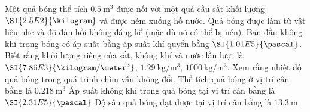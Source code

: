 \begin{ex}
	Một quả bóng thể tích $\SI{0.5}{\meter^3}$ được nối với một quả cầu sắt khối lượng $\SI{2.5E2}{\kilogram}$ và được ném xuống hồ nước. Quả bóng được làm từ vật liệu nhẹ và độ đàn hồi không đáng kể (mặc dù nó có thể bị nén). Ban đầu không khí trong bóng có áp suất bằng áp suất khí quyển bằng $\SI{1.01E5}{\pascal}$. Biết rằng khối lượng riêng của sắt, không khí và nước lần lượt  là $\SI{7.86E3}{\kilogram/\meter^3}$, $\SI{1.29}{\kilogram/\meter^3}$, $\SI{1000}{\kilogram/\meter^3}$. Xem rằng nhiệt độ quả bóng trong quá trình chìm vẫn không đổi.
	{Thể tích quả bóng ở vị trí cân bằng là $\SI{0.218}{\meter^3}$}
	{\True Áp suất không khí trong quả bóng tại vị trí cân bằng là $\SI{2.31E5}{\pascal}$}
	{\True Độ sâu quả bóng đạt được tại vị trí cân bằng là $\SI{13.3}{\meter}$}
\end{ex}
